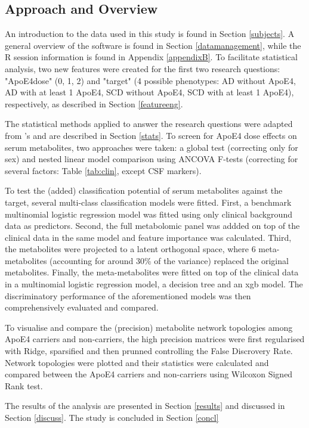 \documentclass{amsart}
\begin{document}
\subsection{Approach and Overview}
An introduction to the data used in this study is found in Section \ref{subjects}. A general overview of the software is found in Section \ref{datamanagement}, while the R session information is found in Appendix \ref{appendixB}. To facilitate statistical analysis, two new features were created for the first two research questions: "ApoE4dose" (0, 1, 2) and "target" (4 possible phenotypes: AD without ApoE4, AD with at least 1 ApoE4, SCD without ApoE4, SCD with at least 1 ApoE4), respectively, as described in Section \ref{featureeng}.

The statistical methods applied to answer the research questions were adapted from \citeauthor{deLeeuw2017Blood-basedDisease}'s  and are described in Section \ref{stats}. To screen for ApoE4 dose effects on serum metabolites, two approaches were taken: a global test (correcting only for sex) and nested linear model comparison using ANCOVA F-tests (correcting for several factors: Table \ref{tab:clin}, except CSF markers). 

To test the (added) classification potential of serum metabolites against the target, several multi-class classification models were fitted. First, a benchmark multinomial logistic regression model was fitted using only clinical background data as predictors. Second, the full metabolomic panel was addded on top of the clinical data in the same model and feature importance was calculated. Third, the metabolites were projected to a latent orthogonal space, where 6 meta-metabolites (accounting for around 30\% of the variance) replaced the original metabolites. Finally, the meta-metabolites were fitted on top of the clinical data in a multinomial logistic regression model, a decision tree and an \acrfull{xgb} model. The discriminatory performance of the aforementioned models was then comprehensively evaluated and compared.

To visualise and compare the (precision) metabolite network topologies among ApoE4 carriers and non-carriers, the high precision matrices were first regularised with Ridge, sparsified and then prunned controlling the False Discrovery Rate. Network topologies were plotted and their statistics were calculated and compared between the ApoE4 carriers and non-carriers using Wilcoxon Signed Rank test.

The results of the analysis are presented in Section \ref{results} and discussed in Section \ref{discuss}. The study is concluded in Section \ref{concl}
\end{document}
